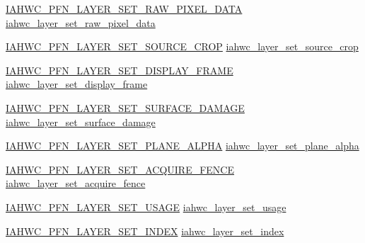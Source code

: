 \begin{DoxyCompactItemize}
\item 
\mbox{\hyperlink{iahwc_8h_a1e1e576efc77f032d0550357bb0d98f1}{I\+A\+H\+W\+C\+\_\+\+P\+F\+N\+\_\+\+L\+A\+Y\+E\+R\+\_\+\+S\+E\+T\+\_\+\+R\+A\+W\+\_\+\+P\+I\+X\+E\+L\+\_\+\+D\+A\+TA}} \mbox{\hyperlink{structiahwc__backend_a21bf458ddb692a832ebae333b1cd77e3}{iahwc\+\_\+layer\+\_\+set\+\_\+raw\+\_\+pixel\+\_\+data}}
\item 
\mbox{\hyperlink{iahwc_8h_ac7b199c17ecff5d053dfdfae361b1bbe}{I\+A\+H\+W\+C\+\_\+\+P\+F\+N\+\_\+\+L\+A\+Y\+E\+R\+\_\+\+S\+E\+T\+\_\+\+S\+O\+U\+R\+C\+E\+\_\+\+C\+R\+OP}} \mbox{\hyperlink{structiahwc__backend_a9b4abeb6617a115f1679f919952906bd}{iahwc\+\_\+layer\+\_\+set\+\_\+source\+\_\+crop}}
\item 
\mbox{\hyperlink{iahwc_8h_a118f1525809f1ef328dd5688df041e35}{I\+A\+H\+W\+C\+\_\+\+P\+F\+N\+\_\+\+L\+A\+Y\+E\+R\+\_\+\+S\+E\+T\+\_\+\+D\+I\+S\+P\+L\+A\+Y\+\_\+\+F\+R\+A\+ME}} \mbox{\hyperlink{structiahwc__backend_a6826b4e3cd481f2e44bcfc0f4e2902b7}{iahwc\+\_\+layer\+\_\+set\+\_\+display\+\_\+frame}}
\item 
\mbox{\hyperlink{iahwc_8h_adcfd825452e18516d0fa2e4ff3925c93}{I\+A\+H\+W\+C\+\_\+\+P\+F\+N\+\_\+\+L\+A\+Y\+E\+R\+\_\+\+S\+E\+T\+\_\+\+S\+U\+R\+F\+A\+C\+E\+\_\+\+D\+A\+M\+A\+GE}} \mbox{\hyperlink{structiahwc__backend_aaf78efc58c573fe0d579f7e94cdf6c1f}{iahwc\+\_\+layer\+\_\+set\+\_\+surface\+\_\+damage}}
\item 
\mbox{\hyperlink{iahwc_8h_ab100143d2efa481cc3c432169016db23}{I\+A\+H\+W\+C\+\_\+\+P\+F\+N\+\_\+\+L\+A\+Y\+E\+R\+\_\+\+S\+E\+T\+\_\+\+P\+L\+A\+N\+E\+\_\+\+A\+L\+P\+HA}} \mbox{\hyperlink{structiahwc__backend_aae2c9d162d5de645e9b0ebcf307cb50d}{iahwc\+\_\+layer\+\_\+set\+\_\+plane\+\_\+alpha}}
\item 
\mbox{\hyperlink{iahwc_8h_a2c73f4cf07f8202b6234fe9888104112}{I\+A\+H\+W\+C\+\_\+\+P\+F\+N\+\_\+\+L\+A\+Y\+E\+R\+\_\+\+S\+E\+T\+\_\+\+A\+C\+Q\+U\+I\+R\+E\+\_\+\+F\+E\+N\+CE}} \mbox{\hyperlink{structiahwc__backend_a6cda4905154cccf3a82fa500a74430b8}{iahwc\+\_\+layer\+\_\+set\+\_\+acquire\+\_\+fence}}
\item 
\mbox{\hyperlink{iahwc_8h_a956199a9af0a303b122e92efc7b59538}{I\+A\+H\+W\+C\+\_\+\+P\+F\+N\+\_\+\+L\+A\+Y\+E\+R\+\_\+\+S\+E\+T\+\_\+\+U\+S\+A\+GE}} \mbox{\hyperlink{structiahwc__backend_afc0aa0cbc9e636caa6c64f6b3e625e72}{iahwc\+\_\+layer\+\_\+set\+\_\+usage}}
\item 
\mbox{\hyperlink{iahwc_8h_ad53e9282840022f0aa2169e3182f1f5b}{I\+A\+H\+W\+C\+\_\+\+P\+F\+N\+\_\+\+L\+A\+Y\+E\+R\+\_\+\+S\+E\+T\+\_\+\+I\+N\+D\+EX}} \mbox{\hyperlink{structiahwc__backend_a20bd8e070d00883888c78d19739d94a4}{iahwc\+\_\+layer\+\_\+set\+\_\+index}}

\end{DoxyCompactItemize}
